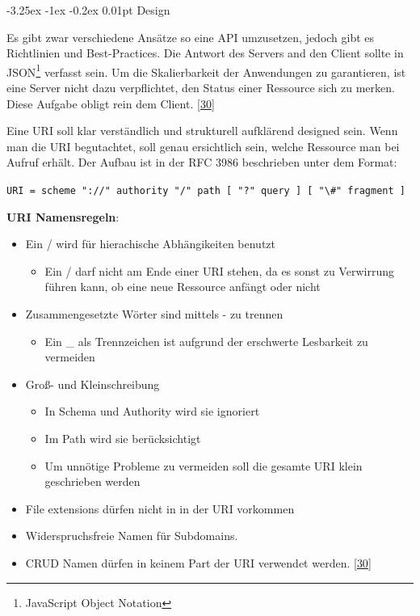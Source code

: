 \documentclass[
    headings=optiontotocandhead,%
    twoside,
    numbers=noenddot,%
    12pt, %
    titlepage, %
    parskip=full, %
    listof=leveldown, 
    numbers=noenddot, %
    a4paper,DIV=14,
    BCOR=15mm,
]{scrbook}
\makeatletter
\newcommand{\passthrough}[1]{#1}
\providecommand{\tightlist}{%
  \setlength{\itemsep}{0pt}\setlength{\parskip}{0pt}}
\renewcommand\paragraph{\@startsection{paragraph}{4}{\z@}%
    {-3.25ex \@plus -1ex \@minus -0.2ex}%
    {0.01pt}%
    {\raggedsection\normalfont\sectfont\nobreak\size@paragraph}%
  }
\makeatother
\begin{document}
\hypertarget{design}{%
\paragraph{Design}\label{design}}

Es gibt zwar verschiedene Ansätze so eine API umzusetzen, jedoch gibt es
Richtlinien und Best-Practices. Die Antwort des Servers and den Client
sollte in JSON\footnote{JavaScript Object Notation} verfasst sein. Um
die Skalierbarkeit der Anwendungen zu garantieren, ist eine Server nicht
dazu verpflichtet, den Status einer Ressource sich zu merken. Diese
Aufgabe obligt rein dem Client.
{[}\protect\hyperlink{ref-REST-API-Design-Rulebook}{30}{]}

Eine URI soll klar verständlich und strukturell aufklärend designed
sein. Wenn man die URI begutachtet, soll genau ersichtlich sein, welche
Ressource man bei Aufruf erhält. Der Aufbau ist in der RFC 3986
beschrieben unter dem Format:

\passthrough{\lstinline!URI = scheme "://" authority "/" path [ "?" query ] [ "\#" fragment ]!}

\textbf{URI Namensregeln}:

\begin{itemize}
\tightlist
\item
  Ein / wird für hierachische Abhängikeiten benutzt

  \begin{itemize}
  \tightlist
  \item
    Ein / darf nicht am Ende einer URI stehen, da es sonst zu Verwirrung
    führen kann, ob eine neue Ressource anfängt oder nicht
  \end{itemize}
\item
  Zusammengesetzte Wörter sind mittels - zu trennen

  \begin{itemize}
  \tightlist
  \item
    Ein \_ als Trennzeichen ist aufgrund der erschwerte Lesbarkeit zu
    vermeiden
  \end{itemize}
\item
  Groß- und Kleinschreibung

  \begin{itemize}
  \tightlist
  \item
    In Schema und Authority wird sie ignoriert
  \item
    Im Path wird sie berücksichtigt
  \item
    Um unnötige Probleme zu vermeiden soll die gesamte URI klein
    geschrieben werden
  \end{itemize}
\item
  File extensions dürfen nicht in in der URI vorkommen
\item
  Widerspruchsfreie Namen für Subdomains.
\item
  CRUD Namen dürfen in keinem Part der URI verwendet werden.
  {[}\protect\hyperlink{ref-REST-API-Design-Rulebook}{30}{]}
\end{itemize}
\end{document}
